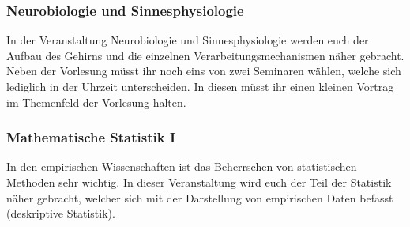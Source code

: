 \subsubsection*{Neurobiologie und Sinnesphysiologie}
In der Veranstaltung Neurobiologie und Sinnesphysiologie werden euch der Aufbau des Gehirns und die einzelnen Verarbeitungsmechanismen näher gebracht. Neben der Vorlesung müsst ihr noch eins von zwei Seminaren wählen, welche sich lediglich in der Uhrzeit unterscheiden. In diesen müsst ihr einen kleinen Vortrag im Themenfeld der Vorlesung halten.

\subsubsection*{Mathematische Statistik I}
In den empirischen Wissenschaften ist das Beherrschen von statistischen Methoden sehr wichtig. In dieser Veranstaltung wird euch der Teil der Statistik näher gebracht, welcher sich mit der Darstellung von empirischen Daten befasst (deskriptive Statistik). 


